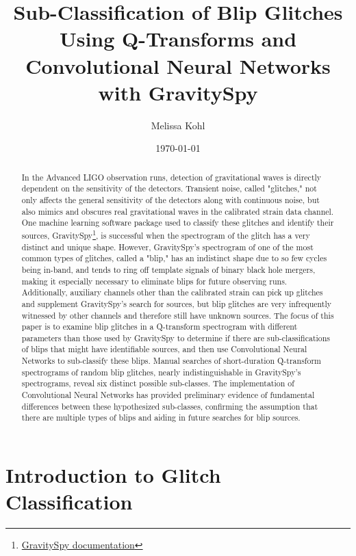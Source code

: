 \documentclass[a4paper]{article}
\title{Sub-Classification of Blip Glitches Using Q-Transforms and Convolutional Neural Networks with GravitySpy}
\author{Melissa Kohl}
\date{\today}
\begin{document}
\maketitle
\graphicspath{ {images/} }

\begin{abstract}

In the Advanced LIGO observation runs, detection of gravitational waves is directly dependent on the sensitivity of the detectors. Transient noise, called "glitches," not only affects the general sensitivity of the detectors along with continuous noise, but also mimics and obscures real gravitational waves in the calibrated strain data channel. One machine learning software package used to classify these glitches and identify their sources, GravitySpy\footnote{\href{https://gravity-spy.github.io}{GravitySpy documentation}}, is successful when the spectrogram of the glitch has a very distinct and unique shape. However, GravitySpy's spectrogram of one of the most common types of glitches, called a "blip," has an indistinct shape due to so few cycles being in-band, and tends to ring off template signals of binary black hole mergers, making it especially necessary to eliminate blips for future observing runs. Additionally, auxiliary channels other than the calibrated strain can pick up glitches and supplement GravitySpy's search for sources, but blip glitches are very infrequently witnessed by other channels and therefore still have unknown sources. The focus of this paper is to examine blip glitches in a Q-transform spectrogram with different parameters than those used by GravitySpy to determine if there are sub-classifications of blips that might have identifiable sources, and then use Convolutional Neural Networks to sub-classify these blips. Manual searches of short-duration Q-transform spectrograms of random blip glitches, nearly indistinguishable in GravitySpy's spectrograms, reveal six distinct possible sub-classes. The implementation of Convolutional Neural Networks has provided preliminary evidence of fundamental differences between these hypothesized sub-classes, confirming the assumption that there are multiple types of blips and aiding in future searches for blip sources.

\end{abstract} 

\section{Introduction to Glitch Classification} \label{introduction}
\end{document}

